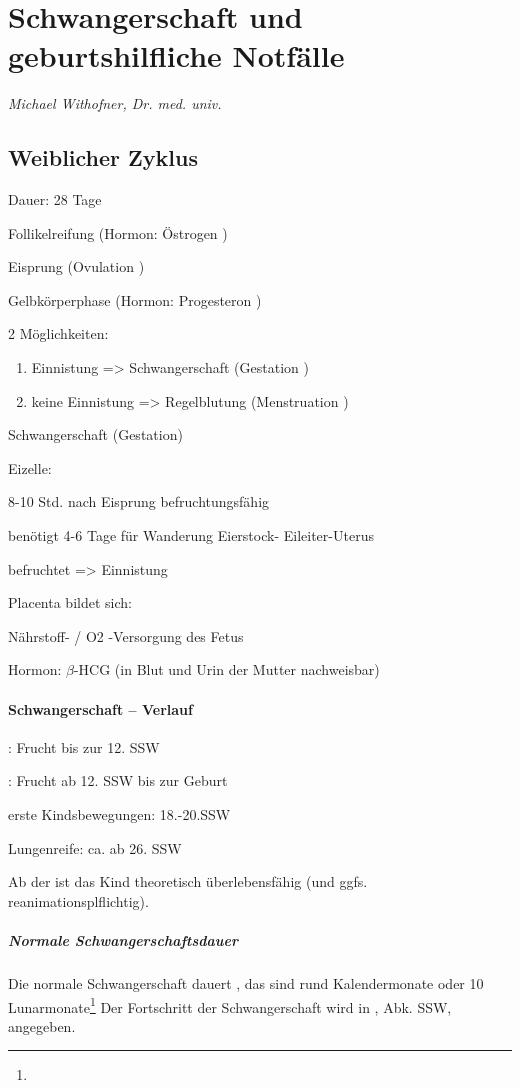 \clearpage
\section{Schwangerschaft und geburtshilfliche Notfälle}
{\mdseries\itshape
Michael Withofner, Dr. med. univ.}

\subsection{Weiblicher Zyklus}

Dauer: 28 Tage

Follikelreifung (Hormon: \"Ostrogen )

Eisprung (Ovulation )

Gelbkörperphase (Hormon: Progesteron )

2 Möglichkeiten:

\begin{enumerate}
    \item Einnistung ={\textgreater} Schwangerschaft (Gestation )
    \item keine Einnistung ={\textgreater} Regelblutung  (Menstruation )
\end{enumerate}

Schwangerschaft (Gestation)

Eizelle:

8-10 Std. nach Eisprung befruchtungsfähig

benötigt 4-6 Tage f\"ur Wanderung Eierstock- Eileiter-Uterus

befruchtet ={\textgreater} Einnistung

Placenta bildet sich: 

Nährstoff- / O2 -Versorgung des Fetus

Hormon: ${\beta}$-HCG (in Blut und Urin der Mutter nachweisbar)

\paragraph{Schwangerschaft -- Verlauf}

 : Frucht bis zur 12. SSW

 : Frucht ab 12. SSW bis zur Geburt

erste Kindsbewegungen: 18.-20.SSW

Lungenreife: ca. ab 26. SSW 

Ab der  ist das Kind theoretisch
\"uberlebensfähig (und ggfs. reanimationsplflichtig).

\subparagraph*{Normale Schwangerschaftsdauer} Die normale Schwangerschaft
dauert , das sind rund Kalendermonate oder 10
Lunarmonate\footnote{} Der
Fortschritt der Schwangerschaft wird in , Abk. SSW,
angegeben.

